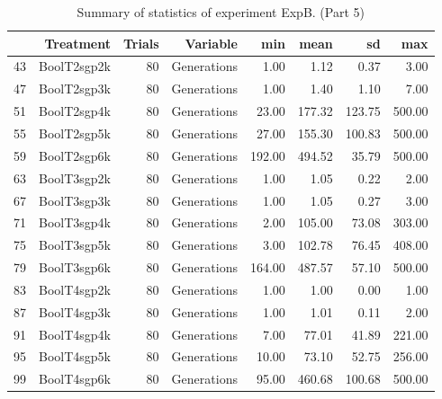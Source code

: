\begin{table}[ht]
\centering
\begin{tabular}{rrrrrrrr}
  \hline
 & Treatment & Trials & Variable & min & mean & sd & max \\ 
  \hline
43 & BoolT2sgp2k &  80 & Generations & 1.00 & 1.12 & 0.37 & 3.00 \\ 
  47 & BoolT2sgp3k &  80 & Generations & 1.00 & 1.40 & 1.10 & 7.00 \\ 
  51 & BoolT2sgp4k &  80 & Generations & 23.00 & 177.32 & 123.75 & 500.00 \\ 
  55 & BoolT2sgp5k &  80 & Generations & 27.00 & 155.30 & 100.83 & 500.00 \\ 
  59 & BoolT2sgp6k &  80 & Generations & 192.00 & 494.52 & 35.79 & 500.00 \\ 
  63 & BoolT3sgp2k &  80 & Generations & 1.00 & 1.05 & 0.22 & 2.00 \\ 
  67 & BoolT3sgp3k &  80 & Generations & 1.00 & 1.05 & 0.27 & 3.00 \\ 
  71 & BoolT3sgp4k &  80 & Generations & 2.00 & 105.00 & 73.08 & 303.00 \\ 
  75 & BoolT3sgp5k &  80 & Generations & 3.00 & 102.78 & 76.45 & 408.00 \\ 
  79 & BoolT3sgp6k &  80 & Generations & 164.00 & 487.57 & 57.10 & 500.00 \\ 
  83 & BoolT4sgp2k &  80 & Generations & 1.00 & 1.00 & 0.00 & 1.00 \\ 
  87 & BoolT4sgp3k &  80 & Generations & 1.00 & 1.01 & 0.11 & 2.00 \\ 
  91 & BoolT4sgp4k &  80 & Generations & 7.00 & 77.01 & 41.89 & 221.00 \\ 
  95 & BoolT4sgp5k &  80 & Generations & 10.00 & 73.10 & 52.75 & 256.00 \\ 
  99 & BoolT4sgp6k &  80 & Generations & 95.00 & 460.68 & 100.68 & 500.00 \\ 
   \hline
\end{tabular}
\caption{Summary of statistics of experiment ExpB. (Part 5)} 
\end{table}
